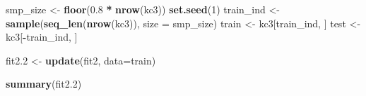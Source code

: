\documentclass[]{article}
\newenvironment{Shaded}{\begin{snugshade}}{\end{snugshade}}
\newcommand{\KeywordTok}[1]{\textcolor[rgb]{0.13,0.29,0.53}{\textbf{#1}}}
\newcommand{\DataTypeTok}[1]{\textcolor[rgb]{0.13,0.29,0.53}{#1}}
\newcommand{\DecValTok}[1]{\textcolor[rgb]{0.00,0.00,0.81}{#1}}
\newcommand{\FloatTok}[1]{\textcolor[rgb]{0.00,0.00,0.81}{#1}}
\newcommand{\StringTok}[1]{\textcolor[rgb]{0.31,0.60,0.02}{#1}}
\newcommand{\OperatorTok}[1]{\textcolor[rgb]{0.81,0.36,0.00}{\textbf{#1}}}
\newcommand{\NormalTok}[1]{#1}
\begin{document}
\begin{Shaded}
\begin{Highlighting}[]
\NormalTok{smp_size <-}\StringTok{ }\KeywordTok{floor}\NormalTok{(}\FloatTok{0.8} \OperatorTok{*}\StringTok{ }\KeywordTok{nrow}\NormalTok{(kc3))}
\KeywordTok{set.seed}\NormalTok{(}\DecValTok{1}\NormalTok{)}
\NormalTok{train_ind <-}\StringTok{ }\KeywordTok{sample}\NormalTok{(}\KeywordTok{seq_len}\NormalTok{(}\KeywordTok{nrow}\NormalTok{(kc3)), }\DataTypeTok{size =}\NormalTok{ smp_size)}
\NormalTok{train <-}\StringTok{ }\NormalTok{kc3[train_ind, ]}
\NormalTok{test <-}\StringTok{ }\NormalTok{kc3[}\OperatorTok{-}\NormalTok{train_ind, ]}

\NormalTok{fit2.}\DecValTok{2}\NormalTok{ <-}\StringTok{ }\KeywordTok{update}\NormalTok{(fit2, }\DataTypeTok{data=}\NormalTok{train)}
\end{Highlighting}
\end{Shaded}

\begin{Shaded}
\begin{Highlighting}[]
\KeywordTok{summary}\NormalTok{(fit2.}\DecValTok{2}\NormalTok{)}
\end{Highlighting}
\end{Shaded}
\end{document}

